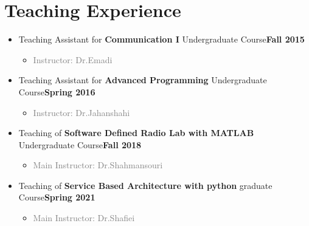 \documentclass[10pt,a4paper,sans]{moderncv} %
\begin{document}






\section{Teaching Experience}

\begin{itemize}

\item Teaching Assistant for \textbf{Communication I} Undergraduate Course\hfill \textbf{Fall 2015}
\begin{itemize} 
\item\textcolor{gray}{Instructor: Dr.Emadi}     \\
\end{itemize}
\item Teaching Assistant for \textbf{Advanced Programming} Undergraduate Course\hfill \textbf{Spring 2016}
\begin{itemize} 
\item\textcolor{gray}{Instructor: Dr.Jahanshahi}   \\
\end{itemize}
\item Teaching of \textbf{Software Defined Radio Lab with MATLAB} Undergraduate Course\hfill \textbf{Fall 2018}
\begin{itemize} 
\item\textcolor{gray}{Main Instructor: Dr.Shahmansouri}   \\
\end{itemize}
\item Teaching of \textbf{Service Based Architecture with python} graduate Course\hfill \textbf{Spring 2021}
\begin{itemize} 
\item\textcolor{gray}{Main Instructor: Dr.Shafiei}   \\
\end{itemize}
\end{itemize}
\end{document}
